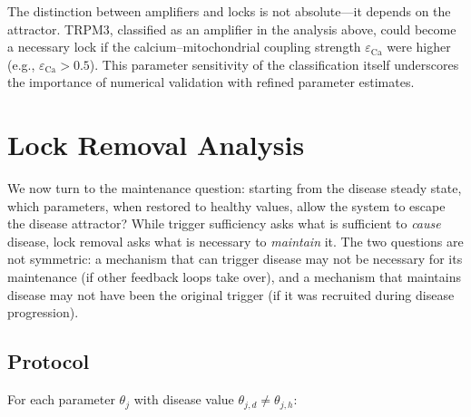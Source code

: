 The distinction between amplifiers and locks is not absolute---it depends on the attractor. TRPM3, classified as an amplifier in the analysis above, could become a necessary lock if the calcium--mitochondrial coupling strength $\varepsilon_{\text{Ca}}$ were higher (e.g., $\varepsilon_{\text{Ca}} > 0.5$). This parameter sensitivity of the classification itself underscores the importance of numerical validation with refined parameter estimates.

\section{Lock Removal Analysis}
\label{sec:lock-removal}

We now turn to the maintenance question: starting from the disease steady state, which parameters, when restored to healthy values, allow the system to escape the disease attractor? While trigger sufficiency asks what is sufficient to \emph{cause} disease, lock removal asks what is necessary to \emph{maintain} it. The two questions are not symmetric: a mechanism that can trigger disease may not be necessary for its maintenance (if other feedback loops take over), and a mechanism that maintains disease may not have been the original trigger (if it was recruited during disease progression).

\subsection{Protocol}

For each parameter $\theta_j$ with disease value $\theta_{j,d} \neq \theta_{j,h}$:

